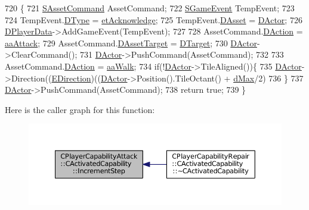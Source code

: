 \begin{DoxyCode}
720                                                                \{
721     \hyperlink{structSAssetCommand}{SAssetCommand} AssetCommand;
722     \hyperlink{structSGameEvent}{SGameEvent} TempEvent;
723     
724     TempEvent.\hyperlink{structSGameEvent_afa10562e243f4ac2b473b655cc58fee7}{DType} = \hyperlink{GameModel_8h_abfcf510bafec7c6429906a6ecaac656da9b68fc38f3ca4002cd7a3ec3cc07a612}{etAcknowledge};
725     TempEvent.\hyperlink{structSGameEvent_a40c85eeac83b96887b7449c9bdc5d624}{DAsset} = \hyperlink{classCActivatedPlayerCapability_a54ca944b47bff2718330639941d402b0}{DActor};
726     \hyperlink{classCActivatedPlayerCapability_a9bf27c322a73f4b11c8183cc1973c3d8}{DPlayerData}->AddGameEvent(TempEvent);
727     
728     AssetCommand.\hyperlink{structSAssetCommand_a8edd3b3d59a76d5514ba403bc8076a75}{DAction} = \hyperlink{GameDataTypes_8h_ab47668e651a3032cfb9c40ea2d60d670a948eefd20b9e43d3b4cfcf613774716d}{aaAttack};
729     AssetCommand.\hyperlink{structSAssetCommand_a3d9b43f6e59c386c48c41a65448a0c39}{DAssetTarget} = \hyperlink{classCActivatedPlayerCapability_a8a1cf50b6501bcfd55af0c935828e395}{DTarget};
730     \hyperlink{classCActivatedPlayerCapability_a54ca944b47bff2718330639941d402b0}{DActor}->ClearCommand();
731     \hyperlink{classCActivatedPlayerCapability_a54ca944b47bff2718330639941d402b0}{DActor}->PushCommand(AssetCommand);
732     
733     AssetCommand.\hyperlink{structSAssetCommand_a8edd3b3d59a76d5514ba403bc8076a75}{DAction} = \hyperlink{GameDataTypes_8h_ab47668e651a3032cfb9c40ea2d60d670a60ca9010aa62b73c1aab838ff4bf7276}{aaWalk};
734     \textcolor{keywordflow}{if}(!\hyperlink{classCActivatedPlayerCapability_a54ca944b47bff2718330639941d402b0}{DActor}->TileAligned())\{
735         \hyperlink{classCActivatedPlayerCapability_a54ca944b47bff2718330639941d402b0}{DActor}->Direction((\hyperlink{GameDataTypes_8h_acb2b033915f6659a71a38b5aa6e4eb42}{EDirection})((\hyperlink{classCActivatedPlayerCapability_a54ca944b47bff2718330639941d402b0}{DActor}->Position().TileOctant() + 
      \hyperlink{GameDataTypes_8h_acb2b033915f6659a71a38b5aa6e4eb42af6546049275557ce0ade2ceee042a319}{dMax}/2) %
736     \}
737     \hyperlink{classCActivatedPlayerCapability_a54ca944b47bff2718330639941d402b0}{DActor}->PushCommand(AssetCommand);
738     \textcolor{keywordflow}{return} \textcolor{keyword}{true};
739 \}
\end{DoxyCode}
Here is the caller graph for this function\+:\nopagebreak
\begin{figure}[H]
\begin{center}
\leavevmode
\includegraphics[width=350pt]{classCPlayerCapabilityAttack_1_1CActivatedCapability_a6b772cbd6be96fbd9bf88380b143856c_icgraph}
\end{center}
\end{figure}
